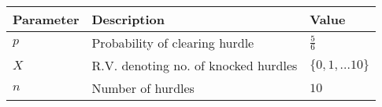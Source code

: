 \begin{tabular}{|l|l|l|}\hline
    Parameter	&Description	&Value\\ \hline
	$p$	&Probability of clearing hurdle	&$\frac{5}{6}$\\ \hline
    $X$	&R.V. denoting no. of knocked hurdles	&$\{0, 1, ... 10\}$\\ \hline
    $n$	&Number of hurdles	&$10$\\ \hline
\end{tabular}
    
